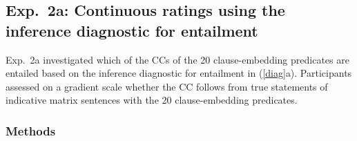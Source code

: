 \documentclass[11pt,fleqn]{article}
\newcommand{\jd}[1]{\textbf{\textcolor{Pink}{[jd: #1]}}}
\newcommand{\6}{\mbox{$[\hspace*{-.6mm}[$}}
\newcommand{\9}{\mbox{$]\hspace*{-.6mm}]$}}
\begin{document}
\subsection{Exp.~2a: Continuous ratings using the inference diagnostic for entailment}\label{s31}

Exp.~2a investigated which of the CCs of the 20 clause-embedding predicates are entailed based on the inference diagnostic for entailment in (\ref{diag}a). Participants assessed on a gradient scale whether the CC follows from true statements of indicative matrix sentences with the 20 clause-embedding predicates.


%

\subsubsection{Methods}
\end{document}
